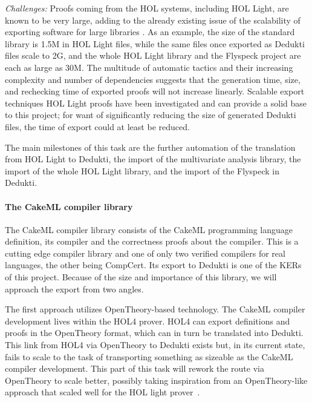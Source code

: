 \emph{Challenges:}
Proofs coming from the HOL systems, including {HOL Light}, are known to
be very large, adding to the already existing issue of the scalability of
exporting software for large libraries
\cite{DBLP:conf/tphol/Wong95,DBLP:conf/cade/ObuaS06,DBLP:conf/itp/KellerW10,
DBLP:conf/cade/Kumar13}. As an example, the size of the standard library is
1.5M in {HOL Light} files, while the same files once
exported as {Dedukti} files scale to 2G, and the whole
{HOL Light} library and the {Flyspeck} project are each as
large as 30M. The multitude of automatic tactics and their increasing
complexity and number of dependencies suggests that the generation time, size,
and rechecking time of exported proofs will not increase linearly. Scalable
export techniques {HOL Light} proofs have been investigated
\cite{KaliszykK13} and can provide a solid base to
this project; for want of significantly reducing the size of generated
{Dedukti} files, the time of export could at least be reduced.

The main milestones of this task are the further automation of the translation
from {HOL Light} to {Dedukti}, the import of the multivariate
analysis library, the import of the whole {HOL Light} library, and the
import of the {Flyspeck} in {Dedukti}.

\paragraph*{The CakeML compiler library}
The CakeML compiler library consists of the CakeML programming language
definition, its compiler and the correctness proofs about the
compiler. This is a cutting edge compiler library and one of only two
verified compilers for real languages, the other being CompCert. Its
export to Dedukti is one of the KERs of this project. Because of the
size and importance of this library, we will approach the export from
two angles.

The first approach utilizes OpenTheory-based technology. The CakeML
compiler development lives within the HOL4 prover. HOL4 can export
definitions and proofs in the OpenTheory format, which can in turn be
translated into Dedukti. This link from HOL4 via OpenTheory to Dedukti
exists but, in its current state, fails to scale to the task of
transporting something as sizeable as the CakeML compiler
development. This part of this task will rework the route via
OpenTheory to scale better, possibly taking inspiration from an
OpenTheory-like approach that scaled well for the HOL light
prover~\cite{KaliszykK13}.

